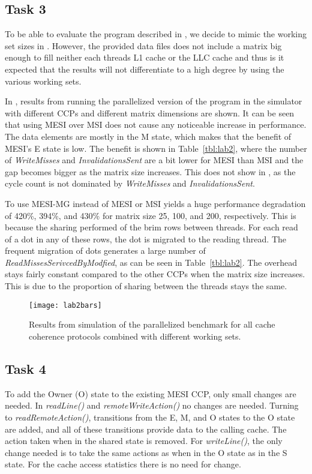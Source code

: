 \subsection{Task 3}
To be able to evaluate the program described in , we decide to mimic the working set sizes in . However, the provided data files does not include a matrix big enough to fill neither each threads L1 cache or the LLC cache and thus is it expected that the results will not differentiate to a high degree by using the various working sets. 

In , results from running the parallelized version of the program in the simulator with different CCPs and different matrix dimensions are shown. It can be seen that using MESI over MSI does not cause any noticeable increase in performance. The data elements are mostly in the M state, which makes that the benefit of MESI's E state is low. The benefit is shown in Table~\ref{tbl:lab2}, where the number of \textit{WriteMisses} and \textit{InvalidationsSent} are a bit lower for MESI than MSI and the gap becomes bigger as the matrix size increases. This does not show in , as the cycle count is not dominated by \textit{WriteMisses} and \textit{InvalidationsSent}.

To use MESI-MG instead of MESI or MSI yields a huge performance degradation of 420\%, 394\%, and 430\% for matrix size 25, 100, and 200, respectively. This is because the sharing performed of the brim rows between threads. For each read of a dot in any of these rows, the dot is migrated to the reading thread. The frequent migration of dots generates a large number of \textit{ReadMissesSerivcedByModfied}, as can be seen in Table~\ref{tbl:lab2}. The overhead stays fairly constant compared to the other CCPs when the matrix size increases. This is due to the proportion of sharing between the threads stays the same.  

\begin{figure}[t]
	\center
	\texttt{[image: lab2bars]}
	\caption{Results from simulation of the parallelized benchmark for all cache coherence protocols combined with different working sets.}
	\label{fig:lab2}
\end{figure}

\subsection{Task 4}
To add the Owner (O) state to the existing MESI CCP, only small changes are needed. In \textit{readLine()} and \textit{remoteWriteAction()} no changes are needed. Turning to \textit{readRemoteAction()}, transitions from the E, M, and O states to the O state are added, and all of these transitions provide data to the calling cache. The action taken when in the shared state is removed. For \textit{writeLine()}, the only change needed is to take the same actions as when in the O state as in the S state. For the cache access statistics there is no need for change.

